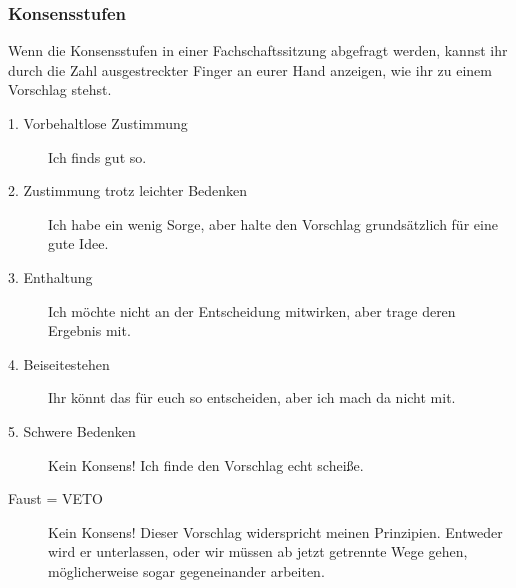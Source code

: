 \vspace*{-1em}

\subsubsection*{Konsensstufen}
\footnotesize
Wenn die Konsensstufen in einer Fachschaftssitzung abgefragt werden, kannst ihr durch die Zahl ausgestreckter Finger an eurer Hand anzeigen, wie ihr zu einem Vorschlag stehst.
\begin{description}
\item[1. Vorbehaltlose Zustimmung] Ich finds gut so.
\item[2. Zustimmung trotz leichter Bedenken] Ich habe ein wenig Sorge, aber halte den Vorschlag grundsätzlich für eine gute Idee.
\item[3. Enthaltung] Ich möchte nicht an der Entscheidung mitwirken, aber trage deren Ergebnis mit.
\item[4. Beiseitestehen] Ihr könnt das für euch so entscheiden, aber ich mach da nicht mit.
\item[5. Schwere Bedenken] Kein Konsens! Ich finde den Vorschlag echt scheiße.
\item[Faust = VETO] Kein Konsens! Dieser Vorschlag widerspricht meinen Prinzipien. Entweder wird er unterlassen, oder wir müssen ab jetzt getrennte Wege gehen, möglicherweise sogar gegeneinander arbeiten.
\end{description}
